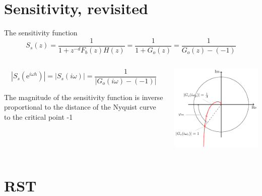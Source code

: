\documentclass[presentation,aspectratio=169]{beamer}
\begin{document}
\section{Sensitivity, revisited}
\label{sec:org9656a9b}
\begin{frame}[label={sec:orgbf6a361}]{The sensitivity function}
\[S_s(z) = \frac{1}{1 + z^{-d}F_b(z)H(z)} = \frac{1}{1 + G_o(z)}= \frac{1}{G_o(z) - (-1)}\]


\begin{columns}
\begin{column}{0.45\columnwidth}
\[|S_s(\mathrm{e}^{i\omega h})| = |S_s(i\omega)| = \frac{1}{| G_o(i\omega) - (-1)|}\]

\alert{The magnitude of the sensitivity function is inverse proportional to the distance of the Nyquist curve to the critical point -1}
\end{column}

\begin{column}{0.65\columnwidth}
\begin{center}
\includegraphics[width=0.6\linewidth]{../../figures/implane-nyquist-margins}
\end{center}
\end{column}
\end{columns}
\end{frame}



\section{RST}
\label{sec:orgb6d580c}
\end{document}
